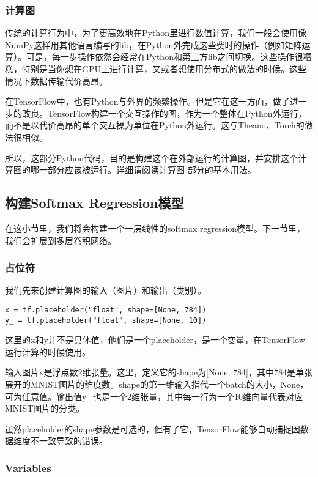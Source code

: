 \subsubsection {计算图}

传统的计算行为中，为了更高效地在Python里进行数值计算，我们一般会使用像NumPy这样用其他语言编写的lib，在Python外完成这些费时的操作（例如矩阵运算）。可是，每一步操作依然会经常在Python和第三方lib之间切换。这些操作很糟糕，特别是当你想在GPU上进行计算，又或者想使用分布式的做法的时候。这些情况下数据传输代价高昂。

在TensorFlow中，也有Python与外界的频繁操作。但是它在这一方面，做了进一步的改良。TensorFlow构建一个交互操作的图，作为一个整体在Python外运行，而不是以代价高昂的单个交互操为单位在Python外运行。这与Theano、Torch的做法很相似。

所以，这部分Python代码，目的是构建这个在外部运行的计算图，并安排这个计算图的哪一部分应该被运行。详细请阅读计算图 部分的基本用法。 %

\subsection{构建Softmax Regression模型}

在这小节里，我们将会构建一个一层线性的softmax regression模型。下一节里，我们会扩展到多层卷积网络。

\subsubsection{占位符}
我们先来创建计算图的输入（图片）和输出（类别）。

\begin{lstlisting}
x = tf.placeholder("float", shape=[None, 784])
y_ = tf.placeholder("float", shape=[None, 10])
\end{lstlisting}

这里的x和y并不是具体值，他们是一个placeholder，是一个变量，在TensorFlow运行计算的时候使用。

输入图片x是浮点数2维张量。这里，定义它的shape为[None, 784]，其中784是单张展开的MNIST图片的维度数。shape的第一维输入指代一个batch的大小，None，可为任意值。输出值y\_也是一个2维张量，其中每一行为一个10维向量代表对应MNIST图片的分类。

虽然placeholder的shape参数是可选的，但有了它，TensorFlow能够自动捕捉因数据维度不一致导致的错误。

\subsubsection{Variables}


